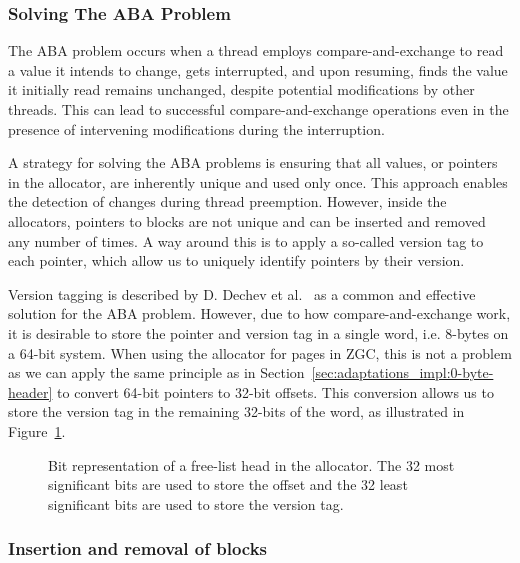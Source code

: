 \subsubsection{Solving The ABA Problem}
\label{sec:adaptations_impl:aba_problem}

The ABA problem occurs when a thread employs compare-and-exchange to read a value it intends to change, gets interrupted, and upon resuming, finds the value it initially read remains unchanged, despite potential modifications by other threads. This can lead to successful compare-and-exchange operations even in the presence of intervening modifications during the interruption.

A strategy for solving the ABA problems is ensuring that all values, or pointers in the allocator, are inherently unique and used only once. This approach enables the detection of changes during thread preemption. However, inside the allocators, pointers to blocks are not unique and can be inserted and removed any number of times. A way around this is to apply a so-called version tag to each pointer, which allow us to uniquely identify pointers by their version.

Version tagging is described by D. Dechev et al.~\cite{bjarne_aba} as a common and effective solution for the ABA problem. However, due to how compare-and-exchange work, it is desirable to store the pointer and version tag in a single word, i.e. 8-bytes on a 64-bit system. When using the allocator for pages in ZGC, this is not a problem as we can apply the same principle as in Section~\ref{sec:adaptations_impl:0-byte-header} to convert 64-bit pointers to 32-bit offsets. This conversion allows us to store the version tag in the remaining 32-bits of the word, as illustrated in Figure~\ref{fig:concurrent_head_bits}.

\begin{figure}[H]
    \centering
    \vspace*{4mm}
    
    \caption{Bit representation of a free-list head in the allocator. The 32 most significant bits are used to store the offset and the 32 least significant bits are used to store the version tag.}
    \label{fig:concurrent_head_bits}
\end{figure}

\subsubsection{Insertion and removal of blocks}

